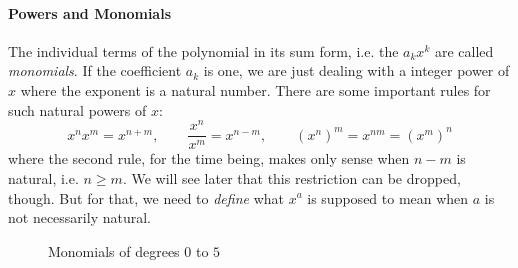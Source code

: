 



\paragraph{Powers and Monomials}
The individual terms of the polynomial in its sum form, i.e. the $a_k x^k$ are called \emph{monomials}. If the coefficient $a_k$ is one, we are just dealing with a integer power of $x$ where the exponent is a natural number. There are some important rules for such natural powers of $x$:
\begin{equation}
\label{Eq:PowerRulesNatural}
x^n x^m = x^{n+m}, \qquad
\frac{x^n}{x^m} = x^{n-m}, \qquad
(x^n)^m =  x^{n m} =  (x^m)^n
\end{equation}
where the second rule, for the time being, makes only sense when $n-m$ is natural, i.e. $n \geq m$. We will see later that this restriction can be dropped, though. But for that, we need to \emph{define} what $x^a$ is supposed to mean when $a$ is not necessarily natural.

\begin{figure}[h]
\centering
\caption{Monomials of degrees $0$ to $5$}
\label{Fig:Monomials}
\end{figure}


